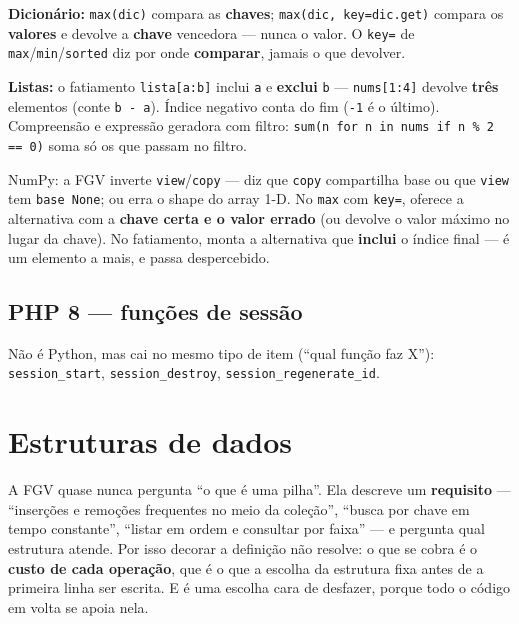 \textbf{Dicionário:} \texttt{max(dic)} compara as \textbf{chaves};
\texttt{max(dic, key=dic.get)} compara os \textbf{valores} e devolve a
\textbf{chave} vencedora --- nunca o valor. O \texttt{key=} de
\texttt{max}/\texttt{min}/\texttt{sorted} diz por onde \textbf{comparar},
jamais o que devolver.

\textbf{Listas:} o fatiamento \texttt{lista[a:b]} inclui \texttt{a} e
\textbf{exclui} \texttt{b} --- \texttt{nums[1:4]} devolve \textbf{três}
elementos (conte \texttt{b - a}). Índice negativo conta do fim
(\texttt{-1} é o último). Compreensão e expressão geradora com filtro:
\texttt{sum(n for n in nums if n \% 2 == 0)} soma só os que passam no filtro.

\begin{pegadinha}
NumPy: a FGV inverte \texttt{view}/\texttt{copy} --- diz que \texttt{copy}
compartilha base ou que \texttt{view} tem \texttt{base None}; ou erra o
shape do array 1-D. No \texttt{max} com \texttt{key=}, oferece a alternativa
com a \textbf{chave certa e o valor errado} (ou devolve o valor máximo no
lugar da chave). No fatiamento, monta a alternativa que \textbf{inclui} o
índice final --- é um elemento a mais, e passa despercebido.
\end{pegadinha}

\subsection{PHP 8 --- funções de sessão}

Não é Python, mas cai no mesmo tipo de item (``qual função faz X''):
\texttt{session\_start}, \texttt{session\_destroy},
\texttt{session\_regenerate\_id}.

\section{Estruturas de dados}
\label{sec:estruturas-dados}

A FGV quase nunca pergunta ``o que é uma pilha''. Ela descreve um
\textbf{requisito} --- ``inserções e remoções frequentes no meio da coleção'',
``busca por chave em tempo constante'', ``listar em ordem e consultar por
faixa'' --- e pergunta qual estrutura atende. Por isso decorar a definição não
resolve: o que se cobra é o \textbf{custo de cada operação}, que é o que a
escolha da estrutura fixa antes de a primeira linha ser escrita. E é uma
escolha cara de desfazer, porque todo o código em volta se apoia nela.

